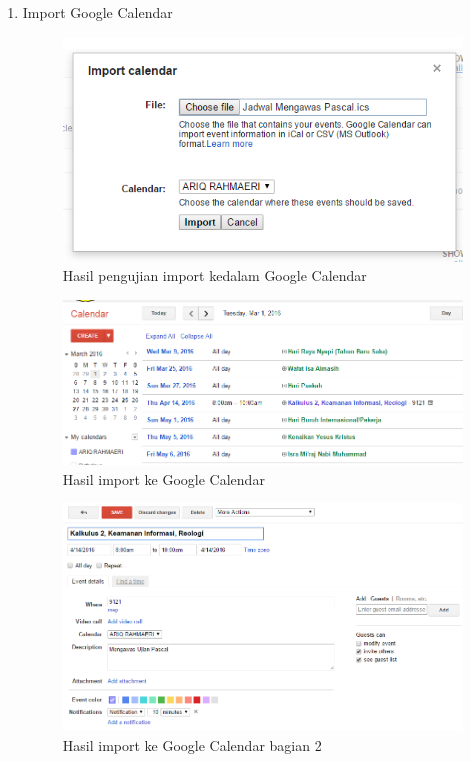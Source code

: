 \begin{enumerate}
	\item Import Google Calendar
		\begin{figure}[H]
		\centering
		\includegraphics[scale=0.7]{Gambar/importGC}
		\caption{Hasil pengujian import kedalam Google Calendar}
		\label{fig:importGC}
		\end{figure}
		
		\begin{figure}[H]
		\centering
		\includegraphics[scale=0.7]{Gambar/hasilGC}
		\caption{Hasil import ke Google Calendar}
		\label{fig:hasilGC}
		\end{figure}
		
		\begin{figure}[H]
		\centering
		\includegraphics[scale=0.5]{Gambar/hasilGC2}
		\caption{Hasil import ke Google Calendar bagian 2 }
		\label{fig:hasilGC2}
		\end{figure}
		

\end{enumerate}
